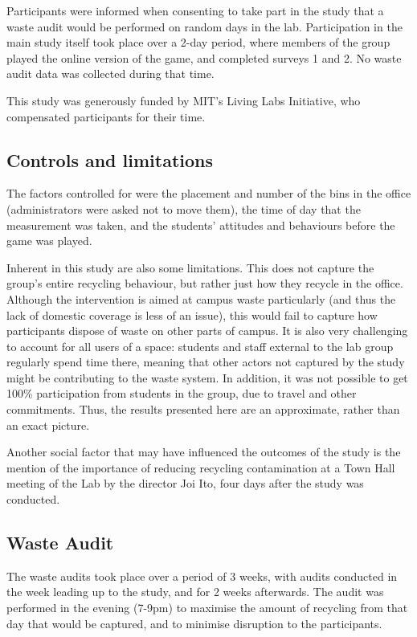 \documentclass[nofonts,nols,justified,nobib]{tufte-book}
\begin{document}
Participants were informed when consenting to take part in the study that a waste audit would be performed on random days in the lab. Participation in the main study itself took place over a 2-day period, where members of the group played the online version of the game, and completed surveys 1 and 2. No waste audit data was collected during that time.

This study was generously funded by MIT's Living Labs Initiative, who compensated participants for their time.

\subsection*{Controls and limitations}
The factors controlled for were the placement and number of the bins in the office (administrators were asked not to move them), the time of day that the measurement was taken, and the students' attitudes and behaviours before the game was played.

Inherent in this study are also some limitations. This does not capture the group's entire recycling behaviour, but rather just how they recycle in the office. Although the intervention is aimed at campus waste particularly (and thus the lack of domestic coverage is less of an issue), this would fail to capture how participants dispose of waste on other parts of campus. It is also very challenging to account for all users of a space: students and staff external to the lab group regularly spend time there, meaning that other actors not captured by the study might be contributing to the waste system. In addition, it was not possible to get 100\% participation from students in the group, due to travel and other commitments. Thus, the results presented here are an approximate, rather than an exact picture.

Another social factor that may have influenced the outcomes of the study is the mention of the importance of reducing recycling contamination at a Town Hall meeting of the Lab by the director Joi Ito, four days after the study was conducted.

\subsection*{Waste Audit}
The waste audits took place over a period of 3 weeks, with audits conducted in the week leading up to the study, and for 2 weeks afterwards. The audit was performed in the evening (7-9pm) to maximise the amount of recycling from that day that would be captured, and to minimise disruption to the participants.
\end{document}
